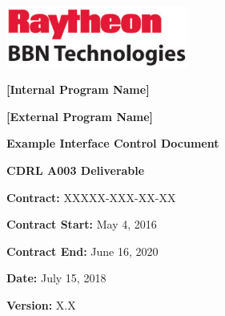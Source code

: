 \documentclass[twoside]{article}
\newcommand{\+}{\discretionary{\mbox{\scriptsize$\hookleftarrow$}}{}{}}
\begin{document}
\begin{titlepage}
\begin{flushleft}
\includegraphics[height=2cm]{rtn_bbn_logo_vertical}
\headrule

\bigskip
\bigskip
\bigskip
\bigskip
\textbf{\Large [Internal Program Name]}

\textbf{\Large [External Program Name]}

\bigskip
\bigskip
\textbf{\Large Example Interface Control Document}

\bigskip
\bigskip
\textbf{\large CDRL A003 Deliverable}

\textbf{\large Contract:} XXXXX-XXX-XX-XX

\textbf{\large Contract Start:} May 4, 2016

\textbf{\large Contract End:} June 16, 2020

\textbf{\large Date:} July 15, 2018

\textbf{\large Version:} X.X
\end{flushleft}
\end{titlepage}
\newpage
{}
\tableofcontents
\newpage
{}

\end{document}
